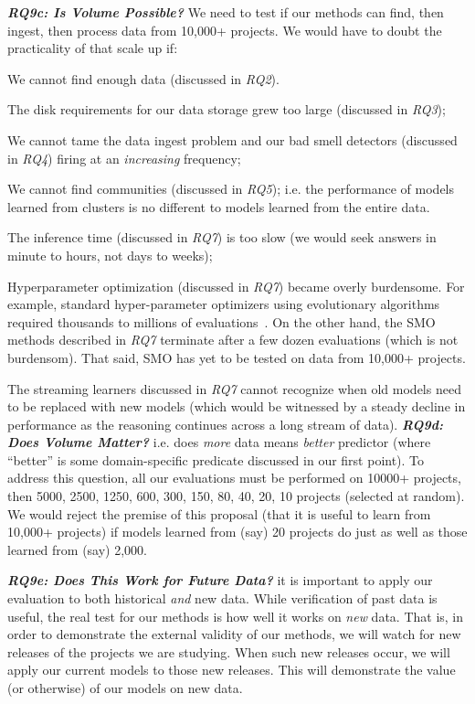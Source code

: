 \textit{\textbf{RQ9c: Is Volume Possible?}} We need to test if our methods
can find, then ingest, then process data from  10,000+ projects. We would have to doubt the practicality of that scale up if:
\bi
\item We cannot find enough data (discussed in {\em RQ2}).
\item The disk requirements for our data storage grew too large (discussed in {\em RQ3}); 
\item We cannot tame the  data ingest problem and our
  bad smell detectors (discussed in {\em RQ4})    firing at an {\em increasing} frequency;
\item We cannot find communities (discussed in {\em RQ5}); i.e. the performance of  models learned from  clusters
 is no different to models learned from the entire data.
 \item The inference time (discussed in {\em RQ7}) is too slow (we would seek answers in minute to hours, not days to weeks);
\item Hyperparameter optimization (discussed in {\em RQ7}) became overly burdensome.
For example, standard hyper-parameter optimizers using evolutionary
algorithms required thousands to millions of evaluations~\cite{sarro2016multi}. 
On the other hand,
the SMO methods described in {\em RQ7} terminate after a few dozen evaluations (which is not burdensom). That said, SMO has yet to be    tested on data from 10,000+ projects.

\item The streaming learners  discussed in {\em RQ7} cannot recognize when
old models need to be replaced with new models (which would be witnessed by a steady decline in performance as the reasoning continues across a long stream of data).
\ei
\textit{\textbf{ RQ9d: Does Volume Matter?}} i.e. does {\em more}
data means {\em better} predictor (where ``better'' is some domain-specific predicate discussed in our first point). To address this question, all our evaluations must be performed on 10000+ projects,
then 5000, 2500, 1250, 600, 300, 150, 80, 40, 20, 10  projects (selected at random).
We would reject the premise of this proposal (that it is useful to learn from 10,000+ projects)
if models learned from (say) 20 projects do just as well as those learned from (say) 2,000.



\textit{\textbf{ RQ9e: Does This Work for Future Data?}}
it is important to apply our evaluation to both historical  {\em and } new data.
While verification of past data is useful, the real test for our methods is how well
it works on {\em new} data. That is, in order to demonstrate the external validity of our methods, we will watch for new releases of the projects we are studying. When such new releases occur, we will apply our current models to those new releases. This will demonstrate the value (or otherwise) of our models on new data.
 
